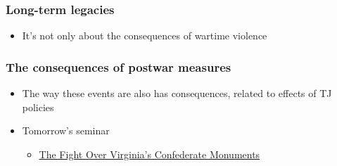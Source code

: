 \documentclass[aspectratio=43]{beamer}
\begin{document}


\begin{frame}
\frametitle{Long-term legacies}
\centering

\begin{itemize}
  \item It's not only about the consequences of wartime violence
\end{itemize}

\end{frame}




\begin{frame}
\frametitle{The consequences of postwar measures}
\centering

\begin{itemize}
  \item The way these events are  also has consequences, related to effects of TJ policies
  \item Tomorrow's seminar
  \begin{itemize}
    \item {\small \href{https://www.newyorker.com/magazine/2017/12/04/the-fight-over-virginias-confederate-monuments}{The Fight Over Virginia's Confederate Monuments}}
  \end{itemize}
\end{itemize}

\end{frame}
\end{document}
